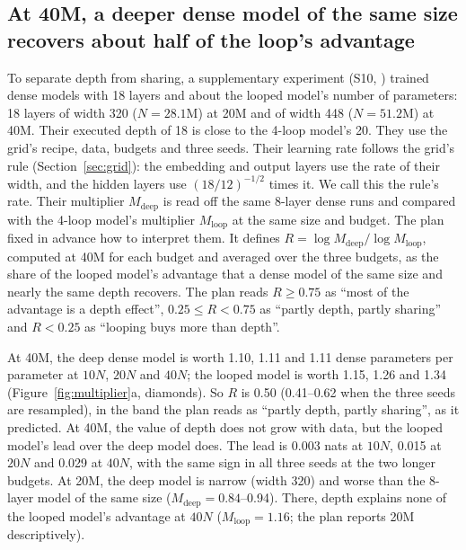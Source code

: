 \subsection{At 40M, a deeper dense model of the same size recovers about half of the loop's advantage}
\label{sec:depth}

To separate depth from sharing, a supplementary experiment (S10, ) trained dense models with 18 layers and about the looped model's number of parameters: 18 layers of
width 320 ($N = 28.1$M) at 20M and of width 448 ($N = 51.2$M) at 40M. Their executed depth of 18 is close to the 4-loop model's 20. They use the grid's recipe, data, budgets and three
seeds. Their learning rate follows the grid's rule
(Section~\ref{sec:grid}): the embedding and output layers use the rate of their width, and the hidden layers use
$(18/12)^{-1/2}$ times it. We call this the
rule's rate. Their multiplier $M_{\mathrm{deep}}$ is read off the same 8-layer dense runs and compared with the 4-loop model's
multiplier $M_{\mathrm{loop}}$ at the same size and budget. The plan fixed in advance how to interpret them. It defines
$R = \log M_{\mathrm{deep}} / \log M_{\mathrm{loop}}$, computed at 40M for each budget and averaged over the three
budgets, as the share of the looped model's advantage that a dense model of the same size and nearly the same
depth recovers. The plan reads $R \geq 0.75$ as ``most of the advantage is a depth effect'', $0.25 \leq R < 0.75$ as ``partly depth, partly sharing'' and $R < 0.25$ as ``looping buys more than depth''.

At 40M, the deep dense model is worth 1.10, 1.11 and 1.11 dense parameters
per parameter at $10N$, $20N$ and $40N$; the looped model is worth 1.15, 1.26 and 1.34 (Figure~\ref{fig:multiplier}a,
diamonds). So $R$ is 0.50 (0.41--0.62 when the three seeds are resampled), in the band the plan reads as ``partly depth, partly sharing'', as it predicted. At 40M, the value of depth does not grow with data, but the looped model's lead
over the deep model does. The lead is 0.003 nats at $10N$, 0.015 at $20N$ and 0.029 at $40N$, with the same sign in all three seeds
at the two longer budgets. At 20M, the deep model is narrow (width 320) and worse than the 8-layer model of the same size
($M_{\mathrm{deep}} = 0.84$--0.94). There, depth explains none of the looped model's advantage at $40N$
($M_{\mathrm{loop}} = 1.16$; the plan reports 20M descriptively).

